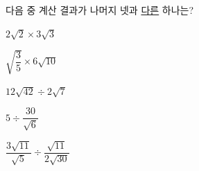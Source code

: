 다음 중 계산 결과가 나머지 넷과 \underline{다른} 하나는?
\begin{choicesii}{\rule[-3ex]{0pt}{8ex}$2\sqrt{2}\times3\sqrt{3}$}{\rule[-3ex]{0pt}{8ex}$\sqrt{\dfrac{3}{5}}\times6\sqrt{10}$}{\rule[-3ex]{0pt}{8ex}$12\sqrt{42}\div2\sqrt{7}$}{\rule[-3ex]{0pt}{8ex}$5\div\dfrac{30}{\sqrt{6}}$}{\rule[-3ex]{0pt}{8ex}$\dfrac{3\sqrt{11}}{\sqrt{5}}\div\dfrac{\sqrt{11}}{2\sqrt{30}}$}\end{choicesii}
